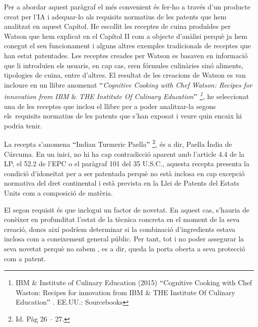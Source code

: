 \documentclass[12pt]{article}
\begin{document}
\vspace{\baselineskip}
\begin{justify}
Per a abordar aquest paràgraf el més convenient és fer-ho a través d’un producte creat per l’IA i adequar-lo als requisits normatius de les patents que hem analitzat en aquest Capítol. He escollit les receptes de cuina produïdes per Watson que hem explicat en el Capítol II com a objecte d’anàlisi perquè ja hem conegut el seu funcionament i alguns altres exemples tradicionals de receptes que han estat patentades.  Les receptes creades per Watson es basaven en informació que li introduïen els usuaris, en cap cas, eren fórmules culinàries sinó aliments, tipologies de cuina, entre d’altres. El resultat de les creacions de Watson es van incloure en un llibre anomenat \textit{$``$Cognitive Cooking with Chef Watson: Recipes for innovation from IBM $\&$  THE Institute Of Culinary Education$"$ \footnote{ IBM $\&$  Institute of Culinary Education (2015) $``$Cognitive Cooking with Chef Waston: Recipes for innovation from IBM $\&$  THE Institute Of Culinary Education$"$ . EE.UU.: Sourcebooks }, }he seleccionat una de les receptes que inclou el llibre per a poder analitzar-la segons els\ requisits normatius  de les patents que s’han exposat i veure quin encaix hi podria tenir. 
\end{justify}\par


\vspace{\baselineskip}
\begin{justify}
La recepta s’anomena $``$Indian Turmeric Paella$"$ \footnote{ Id. Pàg 26 – 27. }, és a dir, Paella Índia de Cúrcuma. En un inici, no hi ha cap contradicció aparent amb l’article 4.4 de la LP, el 52.2 de l’EPC o el paràgraf 101 del 35 U.S.C., aquesta recepta presenta la condició d’idoneïtat per a ser patentada perquè no està inclosa en cap excepció normativa del dret continental i està prevista en la Llei de Patents del Estats Units com a composició de matèria. 
\end{justify}\par


\vspace{\baselineskip}
\begin{justify}
El segon requisit és que inclogui un factor de novetat. En aquest cas, s’hauria de conèixer en profunditat l’estat de la tècnica concreta en el moment de la seva creació, doncs així podríem determinar si la combinació d’ingredients estava inclosa com a coneixement general públic. Per tant, tot i no poder assegurar la seva novetat perquè no sabem , es a dir, queda la porta oberta a seva protecció com a patent.
\end{justify}\par
\end{document}
